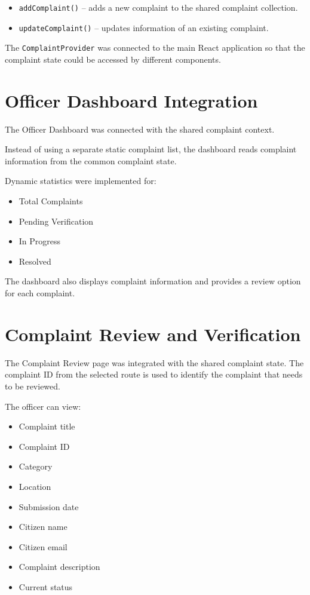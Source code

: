 \documentclass[12pt,a4paper]{article}
\begin{document}
\begin{itemize}
    \item \texttt{addComplaint()} -- adds a new complaint to the shared
    complaint collection.
    
    \item \texttt{updateComplaint()} -- updates information of an existing
    complaint.
\end{itemize}

The \texttt{ComplaintProvider} was connected to the main React application
so that the complaint state could be accessed by different components.

\section{Officer Dashboard Integration}

The Officer Dashboard was connected with the shared complaint context.

Instead of using a separate static complaint list, the dashboard reads
complaint information from the common complaint state.

Dynamic statistics were implemented for:

\begin{itemize}
    \item Total Complaints
    \item Pending Verification
    \item In Progress
    \item Resolved
\end{itemize}

The dashboard also displays complaint information and provides a review
option for each complaint.

\section{Complaint Review and Verification}

The Complaint Review page was integrated with the shared complaint state.
The complaint ID from the selected route is used to identify the complaint
that needs to be reviewed.

The officer can view:

\begin{itemize}
    \item Complaint title
    \item Complaint ID
    \item Category
    \item Location
    \item Submission date
    \item Citizen name
    \item Citizen email
    \item Complaint description
    \item Current status
\end{itemize}
\end{document}
